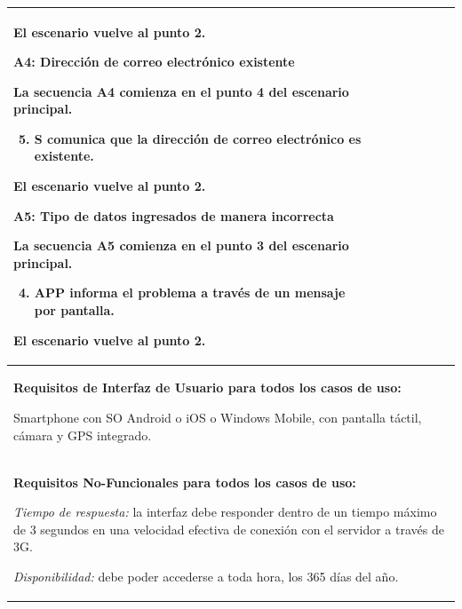 \begin{longtable}{|l|p{5.5cm}|l|p{2cm}|l|p{1.9cm}|}
{					El escenario vuelve al punto 2.

					\textbf{A4: Dirección de correo electrónico existente}
					
					La secuencia A4 comienza en el punto 4 del escenario principal.
					\begin{enumerate}
							\setcounter{enumi}{4}
							\item S comunica que la dirección de correo electrónico es existente.
					\end{enumerate}

					El escenario vuelve al punto 2.

					\textbf{A5: Tipo de datos ingresados de manera incorrecta}
					
					La secuencia A5 comienza en el punto 3 del escenario principal.
					\begin{enumerate}
							\setcounter{enumi}{3}
							\item APP informa el problema a través de un mensaje por pantalla.
					\end{enumerate}

					El escenario vuelve al punto 2.

					} \\ \hline

					\multicolumn{6}{|p{15cm}|}{ \textbf{Requisitos de Interfaz de Usuario para todos los casos de uso: }

					Smartphone con SO Android o iOS o Windows Mobile, con pantalla táctil, cámara y GPS integrado.
					
					} \\ \hline

					\multicolumn{6}{|p{15cm}|}{ \textbf{Requisitos No-Funcionales para todos los casos de uso: }

					\emph{Tiempo de respuesta:} la interfaz debe responder dentro de un tiempo máximo de 3 segundos en una velocidad efectiva de conexión con el servidor a través de 3G.

					\emph{Disponibilidad:} debe poder accederse a toda hora, los 365 días del año.

					} \\ \hline

			\end{longtable}



